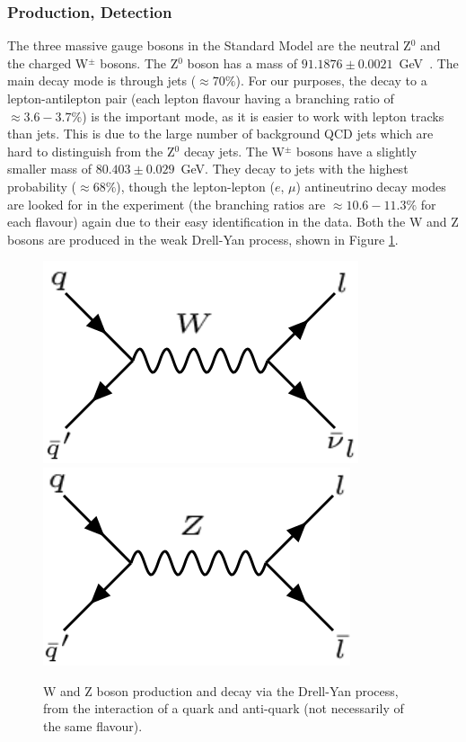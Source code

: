 \documentclass[twocolumn]{article}
\begin{document}
\subsubsection{Production, Detection}
The three massive gauge bosons in the Standard Model are the neutral Z$^0$ and the charged W$^\pm$ bosons. The Z$^0$ boson has a mass of $91.1876 \pm 0.0021$~GeV~\cite{manual}. The main decay mode is through jets ($\approx 70\%$). For our purposes, the decay to a lepton-antilepton pair (each lepton flavour having a branching ratio of $\approx 3.6-3.7 \%$) is the important mode, as it is easier to work with lepton tracks than jets. This is due to the large number of background QCD jets which are hard to distinguish from the Z$^0$ decay jets. The W$^\pm$ bosons have a slightly smaller mass of $80.403 \pm 0.029$~GeV. They decay to jets with the highest probability ($\approx 68 \%$), though the lepton-lepton ($e$, $\mu$) antineutrino decay modes are looked for in the experiment (the branching ratios are $\approx 10.6-11.3\%$ for each flavour) again due to their easy identification in the data. Both the W and Z bosons are produced in the weak Drell-Yan process, shown in Figure \ref{fig:WDiagram}.
\begin{figure} [!h]
\includegraphics[scale=0.33]{Images/WDiagram.png}
\includegraphics[scale=0.33]{Images/ZDiagram_differentflavour.png}
\caption{W and Z boson production and decay via the Drell-Yan process, from the interaction of a quark and anti-quark (not necessarily of the same flavour).}
\label{fig:WDiagram}
\end{figure}
\end{document}
